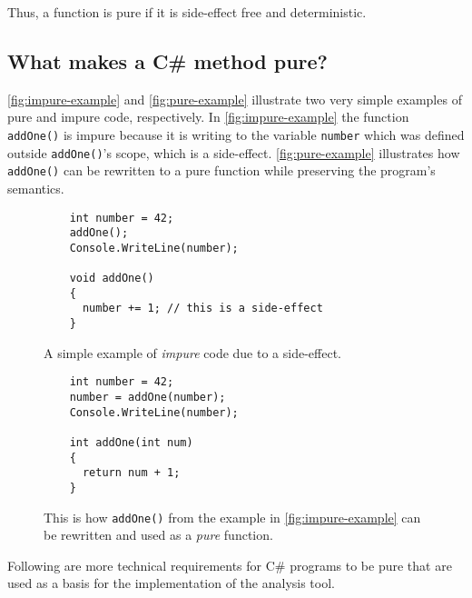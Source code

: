 \documentclass[a4paper,12pt]{article}
\begin{document}
Thus, a function is pure if it is side-effect free and deterministic.

\subsection{What makes a C\# method pure?} \label{sub:What makes a Cs program functional?}
\autoref{fig:impure-example} and \autoref{fig:pure-example} illustrate two very simple examples of pure and impure code, respectively. In \autoref{fig:impure-example} the function \texttt{addOne()} is impure because it is writing to the variable \texttt{number} which was defined outside \texttt{addOne()}'s scope, which is a side-effect. \autoref{fig:pure-example} illustrates how \texttt{addOne()} can be rewritten to a pure function while preserving the program's semantics.

\begin{figure}[H]
  \centering
  \begin{lstlisting}
    int number = 42;
    addOne();
    Console.WriteLine(number);

    void addOne()
    {
      number += 1; // this is a side-effect
    }
  \end{lstlisting}
  \caption{A simple example of \textit{impure} code due to a side-effect.}
  \label{fig:impure-example}
\end{figure}

\begin{figure}[H]
  \centering
  \begin{lstlisting}
    int number = 42;
    number = addOne(number);
    Console.WriteLine(number);

    int addOne(int num)
    {
      return num + 1;
    }
  \end{lstlisting}
  \caption{This is how \texttt{addOne()} from the example in \autoref{fig:impure-example} can be rewritten and used as a \textit{pure} function.}
  \label{fig:pure-example}
\end{figure}

Following are more technical requirements for C\# programs to be pure that are used as a basis for the implementation of the analysis tool. %

\end{document}
